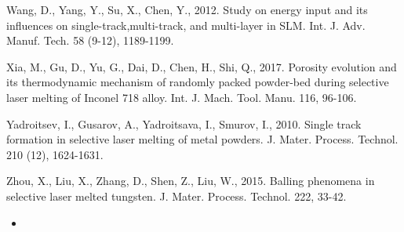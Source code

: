 \documentclass[10pt]{article}
\begin{document}
Wang, D., Yang, Y., Su, X., Chen, Y., 2012. Study on energy input and its influences on single-track,multi-track, and multi-layer in SLM. Int. J. Adv. Manuf. Tech. 58 (9-12), 1189-1199.

Xia, M., Gu, D., Yu, G., Dai, D., Chen, H., Shi, Q., 2017. Porosity evolution and its thermodynamic mechanism of randomly packed powder-bed during selective laser melting of Inconel 718 alloy. Int. J. Mach. Tool. Manu. 116, 96-106.

Yadroitsev, I., Gusarov, A., Yadroitsava, I., Smurov, I., 2010. Single track formation in selective laser melting of metal powders. J. Mater. Process. Technol. 210 (12), 1624-1631.

Zhou, X., Liu, X., Zhang, D., Shen, Z., Liu, W., 2015. Balling phenomena in selective laser melted tungsten. J. Mater. Process. Technol. 222, 33-42.

\begin{itemize}
  \item 
\end{itemize}
\end{document}

